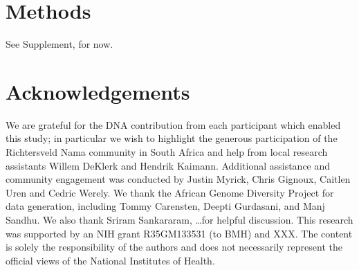 \documentclass[]{article}
\begin{document}
\section*{Methods}

See Supplement, for now.

\section*{Acknowledgements}

We are grateful for the DNA contribution from each participant which enabled
this study; in particular we wish to highlight the generous participation of
the Richtersveld Nama community in South Africa and help from local research
assistants Willem DeKlerk and Hendrik Kaimann. Additional assistance and
community engagement was conducted by Justin Myrick, Chris Gignoux, Caitlen
Uren and Cedric Werely. We thank the African Genome Diversity Project for data
generation, including Tommy Carensten, Deepti Gurdasani, and Manj Sandhu. We
also thank Sriram Sankararam, \dots for helpful discussion. This research was
supported by an NIH grant R35GM133531 (to BMH) and XXX. The content is solely
the responsibility of the authors and does not necessarily represent the
official views of the National Institutes of Health.

\break



\end{document}
